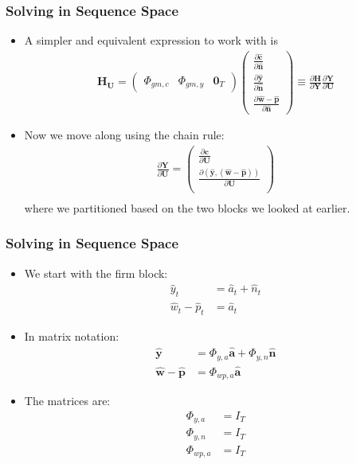 \documentclass[english,xcolor=svgnames]{beamer}
\begin{document}
	
	\begin{frame}
		\frametitle{Solving in Sequence Space}
			\begin{itemize}
				\item A simpler and equivalent expression to work with is
				\begin{align*}
					\mathbf{H}_{\mathbf{U}} = \begin{pmatrix}
						\Phi_{gm,c}  & \Phi_{gm,y}  & \mathbf{0}_T 
					\end{pmatrix}
					\begin{pmatrix}
						\frac{\partial\mathbf{\hat{c}}}{\partial \mathbf{\hat{n}} } \\ 
						\frac{\partial\mathbf{\hat{y}}}{\partial \mathbf{\hat{n}} } \\
						\frac{\partial\mathbf{\hat{w}-\hat{p}}}{\partial \mathbf{\hat{n}} } 
					\end{pmatrix} \equiv \frac{\partial \mathbf{H}}{\partial \mathbf{Y}}\frac{\partial \mathbf{Y}}{\partial \mathbf{U}}
				\end{align*}
				\item Now we move along using the chain rule:
				\begin{align*}
					\frac{\partial \mathbf{Y}}{\partial \mathbf{U}} = \begin{pmatrix}
						\frac{\partial \mathbf{c}}{\partial \mathbf{U}} \\
						\frac{\partial (\mathbf{\hat{y}},\mathbf{(\hat{w}-\hat{p})})}{\partial \mathbf{U}}\\
					\end{pmatrix} \\
				\end{align*}
				where we partitioned based on the two blocks we looked at earlier.
			\end{itemize}
	\end{frame}
	
	
	\begin{frame}
		\frametitle{Solving in Sequence Space}
			\begin{itemize}
				\item We start with the firm block:
				\begin{align*}
					\hat{y}_t&=\hat{a}_t + \hat{n}_{t} \\
					\hat{w}_t - \hat{p}_t &= \hat{a}_t 
				\end{align*}
				\item In matrix notation:
				\begin{align*}
					\mathbf{\hat{y}} &= \Phi_{y,a}\mathbf{\hat{a}} + \Phi_{y,n}\mathbf{\hat{n}} \\
					\mathbf{\hat{w}-\hat{p}} &= \Phi_{wp,a}\mathbf{\hat{a}}
				\end{align*}
				\item The matrices are:
				\begin{align*}
					\Phi_{y,a}&=I_T\\
					\Phi_{y,n}&=I_T \\
					\Phi_{wp,a}&=I_T 
				\end{align*}
			\end{itemize}
	\end{frame}
\end{document}
